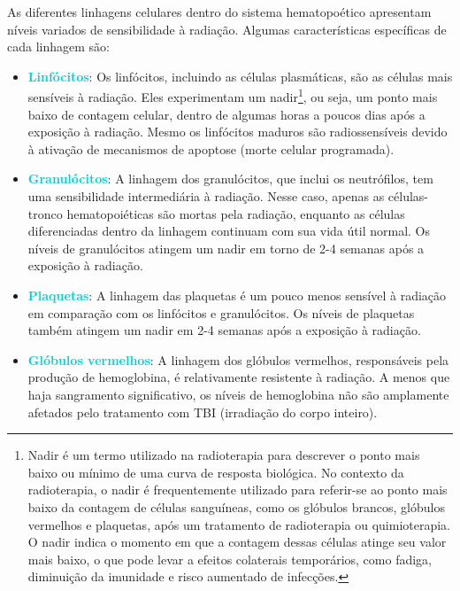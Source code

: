 \documentclass[11pt,a4paper]{article}
\begin{document}
	As diferentes linhagens celulares dentro do sistema hematopoético apresentam níveis variados de sensibilidade à radiação. Algumas características específicas de cada linhagem são:

	\begin{itemize}
		\item \textcolor{DarkTurquoise}{\textbf{Linfócitos}}: Os linfócitos, incluindo as células plasmáticas, são as células mais sensíveis à radiação. Eles experimentam um nadir\footnote{Nadir é um termo utilizado na radioterapia para descrever o ponto mais baixo ou mínimo de uma curva de resposta biológica. No contexto da radioterapia, o nadir é frequentemente utilizado para referir-se ao ponto mais baixo da contagem de células sanguíneas, como os glóbulos brancos, glóbulos vermelhos e plaquetas, após um tratamento de radioterapia ou quimioterapia. O nadir indica o momento em que a contagem dessas células atinge seu valor mais baixo, o que pode levar a efeitos colaterais temporários, como fadiga, diminuição da imunidade e risco aumentado de infecções. }, ou seja, um ponto mais baixo de contagem celular, dentro de algumas horas a poucos dias após a exposição à radiação. Mesmo os linfócitos maduros são radiossensíveis devido à ativação de mecanismos de apoptose (morte celular programada).

		\item \textcolor{DarkTurquoise}{\textbf{Granulócitos}}: A linhagem dos granulócitos, que inclui os neutrófilos, tem uma sensibilidade intermediária à radiação. Nesse caso, apenas as células-tronco hematopoiéticas são mortas pela radiação, enquanto as células diferenciadas dentro da linhagem continuam com sua vida útil normal. Os níveis de granulócitos atingem um nadir em torno de 2-4 semanas após a exposição à radiação.

		\item \textcolor{DarkTurquoise}{\textbf{Plaquetas}}: A linhagem das plaquetas é um pouco menos sensível à radiação em comparação com os linfócitos e granulócitos. Os níveis de plaquetas também atingem um nadir em 2-4 semanas após a exposição à radiação.

		\item \textcolor{DarkTurquoise}{\textbf{Glóbulos vermelhos}}: A linhagem dos glóbulos vermelhos, responsáveis pela produção de hemoglobina, é relativamente resistente à radiação. A menos que haja sangramento significativo, os níveis de hemoglobina não são amplamente afetados pelo tratamento com TBI (irradiação do corpo inteiro).
	\end{itemize}
\end{document}
